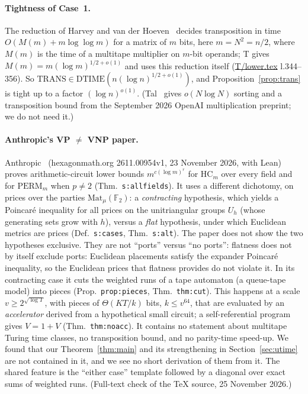 \documentclass[11pt]{article}
\theoremstyle{definition}
\theoremstyle{remark}
\newcommand{\F}{\mathbb F}
\newcommand{\DTIME}{\mathrm{DTIME}}
\newcommand{\TRANS}{\mathrm{TRANS}}
\newcommand{\src}[1]{\url{#1}}
\begin{document}
\paragraph{Tightness of Case~1.} The reduction of Harvey and van der Hoeven~\cite[Corollary 6.2]{HvdH} decides transposition in
time $O(M(m)+m\log\log m)$ for a matrix of $m$ bits, here $m=N^2=n/2$, where $M(m)$ is the time of a multitape multiplier on
$m$-bit operands; T gives
$M(m)=m(\log m)^{1/2+o(1)}$ and uses this reduction itself (\src{T/lower.tex} l.344--356). So
$\TRANS\in\DTIME(n(\log n)^{1/2+o(1)})$, and Proposition~\ref{prop:trans} is tight up to a factor $(\log n)^{o(1)}$.
(Tal~\cite{Tal} gives $o(N\log N)$ sorting and a transposition bound from the September 2026 OpenAI multiplication preprint; we do
not need it.)

\paragraph{Anthropic's VP $\ne$ VNP paper.} Anthropic~\cite{Ant} (hexagonmath.org 2611.00954v1, 23 November 2026, with Lean) proves
arithmetic-circuit lower bounds $m^{c(\log m)^{r}}$ for $\mathrm{HC}_m$ over every field and for $\mathrm{PERM}_m$ when $p\ne2$
(Thm.~\texttt{s:allfields}). It uses a different dichotomy, on prices over the parties $\mathrm{Mat}_\mu(\F_2)$: a
\emph{contracting} hypothesis, which yields a Poincar\'e inequality for all prices on the unitriangular groups $U_h$ (whose
generating sets grow with $h$), versus a \emph{flat} hypothesis, under which Euclidean metrics are prices (Def.~\texttt{s:cases},
Thm.~\texttt{s:alt}). The paper does not show the two hypotheses exclusive. They are not ``ports'' versus ``no ports'': flatness
does not by itself exclude ports: Euclidean placements satisfy the expander Poincar\'e inequality, so the Euclidean prices that
flatness provides do not violate it.
In its contracting case it cuts the weighted runs of a tape automaton (a queue-tape model) into pieces (Prop.~\texttt{prop:pieces},
Thm.~\texttt{thm:cut}). This happens at a scale $v\ge2^{\sqrt{\log T}}$, with pieces of $\Theta(KT/k)$ bits, $k\le v^{64}$, that
are evaluated by an \emph{accelerator} derived from a hypothetical small circuit; a self-referential program gives $V=1+V$
(Thm.~\texttt{thm:noacc}). It contains no statement about multitape Turing time classes, no transposition bound, and no parity-time
speed-up. We found that our Theorem~\ref{thm:main} and its strengthening in Section~\ref{sec:utime} are not contained in it,
and we see no short derivation of them from it. The shared feature is the ``either case'' template followed by a diagonal over exact sums of weighted runs.
(Full-text check of the TeX source, 25 November 2026.)
\end{document}
